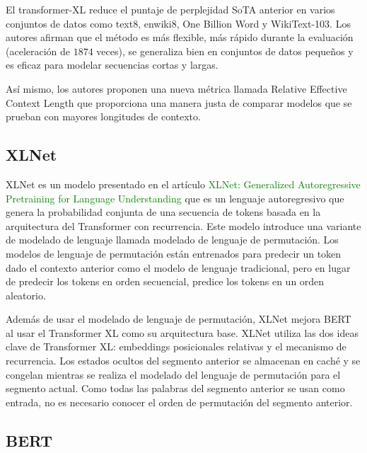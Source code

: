 \documentclass[conference]{IEEEtran}
\begin{document}
\vspace{0.2cm}


El transformer-XL reduce el puntaje de perplejidad SoTA anterior en varios conjuntos de datos como text8, enwiki8, One Billion Word y WikiText-103. Los autores afirman que el m\'etodo es m\'as flexible, m\'as r\'apido durante la evaluaci\'on (aceleraci\'on de $1874$ veces), se generaliza bien en conjuntos de datos peque\~nos y es eficaz para modelar secuencias cortas y largas.

\vspace{0.2cm}

As\'i mismo, los autores proponen una nueva m\'etrica llamada Relative Effective Context Length que proporciona una manera justa de comparar modelos que se prueban con mayores longitudes de contexto.

\subsection{XLNet}

XLNet es un modelo presentado en el art\'iculo \textcolor{green}{XLNet: Generalized Autoregressive Pretraining for Language Understanding} \cite{b8} que es un lenguaje autoregresivo que genera la probabilidad conjunta de una secuencia de tokens basada en la arquitectura del Transformer con recurrencia. Este modelo introduce una variante de modelado de lenguaje llamada modelado de lenguaje de permutaci\'on. Los modelos de lenguaje de permutaci\'on est\'an entrenados para predecir un token dado el contexto anterior como el modelo de lenguaje tradicional, pero en lugar de predecir los tokens en orden secuencial, predice los tokens en un orden aleatorio.

\vspace{0.2cm}

Adem\'as de usar el modelado de lenguaje de permutaci\'on, XLNet mejora BERT  al usar el Transformer XL como su arquitectura base. XLNet utiliza las dos ideas clave de Transformer XL: embeddings posicionales relativas y el mecanismo de recurrencia. Los estados ocultos del segmento anterior se almacenan en cach\'e y se congelan mientras se realiza el modelado del lenguaje de permutaci\'on para el segmento actual. Como todas las palabras del segmento anterior se usan como entrada, no es necesario conocer el orden de permutaci\'on del segmento anterior.
	
\subsection{BERT}
\end{document}
